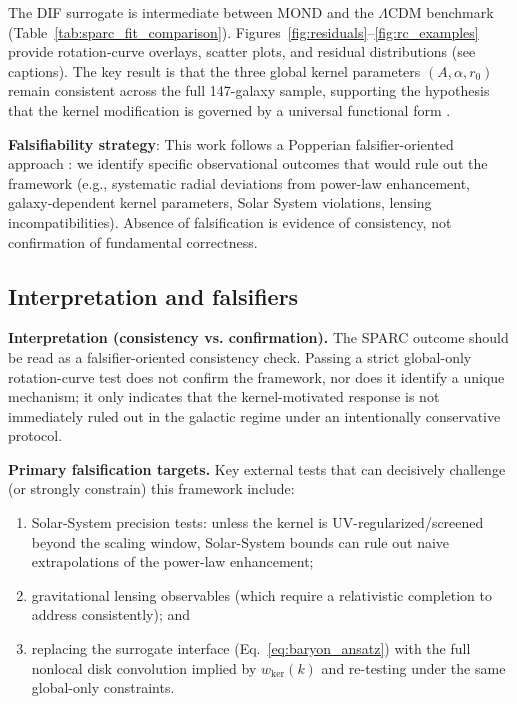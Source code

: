 \documentclass[entropy,article,submit,pdftex,moreauthors]{Definitions/mdpi}
\newcommand{\add}[1]{#1}
\begin{document}
The DIF surrogate is intermediate between MOND and the $\Lambda$CDM benchmark (Table~\ref{tab:sparc_fit_comparison}). \add{Figures~\ref{fig:residuals}--\ref{fig:rc_examples} provide rotation-curve overlays, scatter plots, and residual distributions (see captions).} The key result is that the three global kernel parameters $(A,\alpha,r_0)$ remain consistent across the full 147-galaxy sample, supporting the hypothesis that the kernel modification is governed by a universal functional form \cite{mcgaugh2016,lelli2017}.

\add{\textbf{Falsifiability strategy}: This work follows a Popperian falsifier-oriented approach \cite{Popper_1959}: we identify specific observational outcomes that would rule out the framework (e.g., systematic radial deviations from power-law enhancement, galaxy-dependent kernel parameters, Solar System violations, lensing incompatibilities). Absence of falsification is evidence of consistency, not confirmation of fundamental correctness.}

\subsection{Interpretation and falsifiers}

\textbf{Interpretation (consistency vs. confirmation).} The SPARC outcome should be read as a falsifier-oriented consistency check. Passing a strict global-only rotation-curve test does not confirm the framework, nor does it identify a unique mechanism; it only indicates that the kernel-motivated response is not immediately ruled out in the galactic regime under an intentionally conservative protocol.

\textbf{Primary falsification targets.} Key external tests that can decisively challenge (or strongly constrain) this framework include:
\begin{enumerate}[label=(\roman*), itemsep=0pt, topsep=2pt]
  \item Solar-System precision tests: unless the kernel is UV-regularized/screened beyond the scaling window, Solar-System bounds can rule out naive extrapolations of the power-law enhancement;
  \item gravitational lensing observables (which require a relativistic completion to address consistently); and
  \item replacing the surrogate interface (Eq.~\ref{eq:baryon_ansatz}) with the full nonlocal disk convolution implied by $w_{\mathrm{ker}}(k)$ and re-testing under the same global-only constraints.
\end{enumerate}
\end{document}
